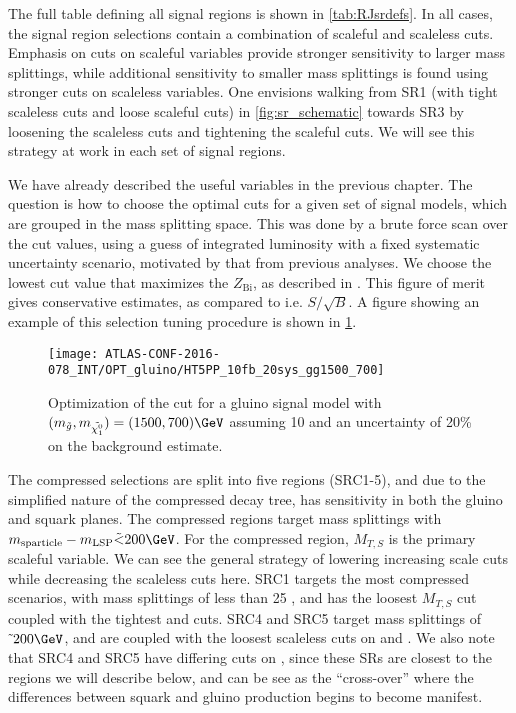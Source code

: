 The full table defining all signal regions is shown in \ref{tab:RJsrdefs}.
In all cases, the signal region selections contain a combination of scaleful and scaleless cuts.
Emphasis on cuts on scaleful variables provide stronger sensitivity to larger mass splittings, while additional sensitivity to smaller mass splittings is found using stronger cuts on scaleless variables.
One envisions walking from SR1 (with tight scaleless cuts and loose scaleful cuts) in \ref{fig:sr_schematic} towards SR3 by loosening the scaleless cuts and tightening the scaleful cuts.
We will see this strategy at work in each set of signal regions.

We have already described the useful variables in the previous chapter.
The question is how to choose the optimal cuts for a given set of signal models, which are grouped in the mass splitting space.
This was done by a brute force scan over the cut values, using a guess of integrated luminosity with a fixed systematic uncertainty scenario, motivated by that from previous analyses.
We choose the lowest cut value that maximizes the $Z_{\text{Bi}}$, as described in \cite{Cousins:2008zz}.
This figure of merit gives conservative estimates, as compared to i.e. $S/\sqrt{B}$.
A figure showing an example of this selection tuning procedure is shown in \ref{fig:sr_optimization}.

\begin{figure}
\caption{Optimization of the  cut for a gluino signal model with $(m_{\gluino}, m_{\lsp} ) = (1500,700) \GeV $ assuming 10 \ifb and an uncertainty of 20\% on the background estimate.
} \label{fig:sr_optimization}
\texttt{[image: ATLAS-CONF-2016-078\_INT/OPT\_gluino/HT5PP\_10fb\_20sys\_gg1500\_700]}
\end{figure}

The compressed selections are split into five regions (SRC1-5), and due to the simplified nature of the compressed decay tree, has sensitivity in both the gluino and squark planes.
The compressed regions target mass splittings with $m_{\text{sparticle}} - m_{\text{LSP}} \tilde{<} 200 \GeV$.
For the compressed region, $M_{T, S}$ is the primary scaleful variable.
We can see the general strategy of lowering increasing scale cuts while decreasing the scaleless cuts here.
SRC1 targets the most compressed scenarios, with mass splittings of less than 25 \GeV, and has the loosest $M_{T, S}$ cut coupled with the tightest \risr and \dphiISR cuts.
SRC4 and SRC5 target mass splittings of $\tilde{~} 200 \GeV$, and are coupled with the loosest scaleless cuts on \risr and \dphiISR.
We also note that SRC4 and SRC5 have differing cuts on \NVjet, since these SRs are closest to the regions we will describe below, and can be see as the ``cross-over'' where the differences between squark and gluino production begins to become manifest.

